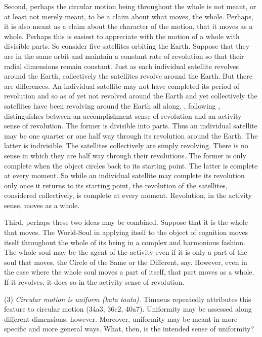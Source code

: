 Second, perhaps the circular motion being throughout the whole is not meant, or at least not merely meant, to be a claim about what moves, the whole. Perhaps, it is also meant as a claim about the character of the motion, that it moves as a whole. Perhaps this is easiest to appreciate with the motion of a whole with divisible parts. So consider five satellites orbiting the Earth. Suppose that they are in the same orbit and maintain a constant rate of revolution so that their radial dimensions remain constant. Just as each individual satellite revolves around the Earth, collectively the satellites revolve around the Earth. But there are differences. An individual satellite may not have completed its period of revolution and so as of yet not revolved around the Earth and yet collectively the satellites have been revolving around the Earth all along. \citet{Lee:1976xs}, following \citet{Vendler:1967ab}, distinguishes between an accomplishment sense of revolution and an activity sense of revolution. The former is divisible into parts. Thus an individual satellite may be one quarter or one half way through its revolution around the Earth. The latter is indivisible. The satellites collectively are simply revolving. There is no sense in which they are half way through their revolutions. The former is only complete when the object circles back to its starting point. The latter is complete at every moment. So while an individual satellite may complete its revolution only once it returns to its starting point, the revolution of the satellites, considered collectively, is complete at every moment. Revolution, in the activity sense, moves as a whole.

Third, perhaps these two ideas may be combined. Suppose that it is the whole that moves. The World-Soul in applying itself to the object of cognition moves itself throughout the whole of its being in a complex and harmonious fashion. The whole soul may be the agent of the activity even if it is only a part of the soul that moves, the Circle of the Same or the Different, say. However, even in the case where the whole soul moves a part of itself, that part moves as a whole. If it revolves, it does so in the activity sense of revolution. 


(3) \emph{Circular motion is uniform (\emph{kata tauta}).} Timaeus repeatedly attributes this feature to circular motion (34a3, 36c2, 40a7). Uniformity may be assessed along different dimensions, however. Moreover, uniformity may be meant in more specific and more general ways. What, then, is the intended sense of uniformity? 

